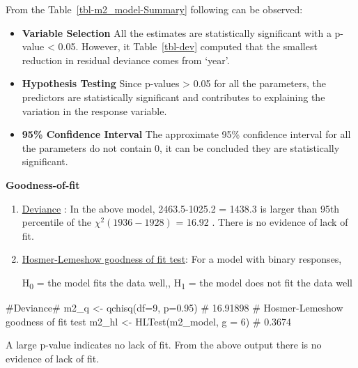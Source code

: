 \documentclass[
  letterpaper,
  DIV=11,
  numbers=noendperiod]{scrartcl}
\newenvironment{Shaded}{\begin{snugshade}}{\end{snugshade}}
\newcommand{\AttributeTok}[1]{\textcolor[rgb]{0.40,0.45,0.13}{#1}}
\newcommand{\CommentTok}[1]{\textcolor[rgb]{0.37,0.37,0.37}{#1}}
\newcommand{\DecValTok}[1]{\textcolor[rgb]{0.68,0.00,0.00}{#1}}
\newcommand{\FloatTok}[1]{\textcolor[rgb]{0.68,0.00,0.00}{#1}}
\newcommand{\FunctionTok}[1]{\textcolor[rgb]{0.28,0.35,0.67}{#1}}
\newcommand{\NormalTok}[1]{\textcolor[rgb]{0.00,0.23,0.31}{#1}}
\newcommand{\OtherTok}[1]{\textcolor[rgb]{0.00,0.23,0.31}{#1}}
\begin{document}
From the Table~\ref{tbl-m2_model-Summary} following can be observed:

\begin{itemize}
\item
  \textbf{Variable Selection} All the estimates are statistically
  significant with a p-value \textless{} 0.05. However, it
  Table~\ref{tbl-dev} computed that the smallest reduction in residual
  deviance comes from `year'.
\item
  \textbf{Hypothesis Testing} Since p-values \textgreater{} 0.05 for all
  the parameters, the predictors are statistically significant and
  contributes to explaining the variation in the response variable.
\item
  \textbf{95\% Confidence Interval} The approximate 95\% confidence
  interval for all the parameters do not contain 0, it can be concluded
  they are statistically significant.
\end{itemize}

\textbf{Goodness-of-fit}

\begin{enumerate}
\def\labelenumi{\arabic{enumi}.}
\item
  \ul{Deviance} : In the above model, 2463.5-1025.2 = 1438.3 is larger
  than 95th percentile of the \(\chi^2(1936-1928)\) = 16.92 . There is
  no evidence of lack of fit.
\item
  \ul{Hosmer-Lemeshow goodness of fit test}: For a model with binary
  responses,

  H\textsubscript{0} = the model fits the data well,, H\textsubscript{1}
  = the model does not fit the data well
\end{enumerate}

\begin{Shaded}
\begin{Highlighting}[]
\CommentTok{\#Deviance\#}
\NormalTok{m2\_q }\OtherTok{\textless{}{-}} \FunctionTok{qchisq}\NormalTok{(}\AttributeTok{df=}\DecValTok{9}\NormalTok{, }\AttributeTok{p=}\FloatTok{0.95}\NormalTok{) }\CommentTok{\# 16.91898}
\CommentTok{\# Hosmer{-}Lemeshow goodness of fit test}
\NormalTok{m2\_hl }\OtherTok{\textless{}{-}} \FunctionTok{HLTest}\NormalTok{(m2\_model, }\AttributeTok{g =} \DecValTok{6}\NormalTok{) }\CommentTok{\# 0.3674}
\end{Highlighting}
\end{Shaded}

A large p-value indicates no lack of fit. From the above output there is
no evidence of lack of fit.
\end{document}
